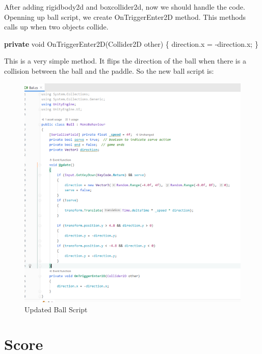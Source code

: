 \documentclass[
]{book}
\newenvironment{Shaded}{\begin{snugshade}}{\end{snugshade}}
\newcommand{\DataTypeTok}[1]{\textcolor[rgb]{0.13,0.29,0.53}{#1}}
\newcommand{\FunctionTok}[1]{\textcolor[rgb]{0.00,0.00,0.00}{#1}}
\newcommand{\KeywordTok}[1]{\textcolor[rgb]{0.13,0.29,0.53}{\textbf{#1}}}
\newcommand{\NormalTok}[1]{#1}
\begin{document}
After adding rigidbody2d and boxcollider2d, now we should handle the code. Openning up ball script, we create OnTriggerEnter2D method. This methods calls up when two objects collide.

\begin{Shaded}
\begin{Highlighting}[]
\KeywordTok{private} \DataTypeTok{void} \FunctionTok{OnTriggerEnter2D}\NormalTok{(Collider2D other)}
\NormalTok{\{}
\NormalTok{  direction.}\FunctionTok{x}\NormalTok{ = -direction.}\FunctionTok{x}\NormalTok{;}
\NormalTok{\}}
\end{Highlighting}
\end{Shaded}

This is a very simple method. It flips the direction of the ball when there is a collision between the ball and the paddle. So the new ball script is:

\begin{figure}
\centering
\includegraphics{Images/BallScript2.png}
\caption{Updated Ball Script}
\end{figure}

\hypertarget{score}{%
\section{Score}\label{score}}
\end{document}
